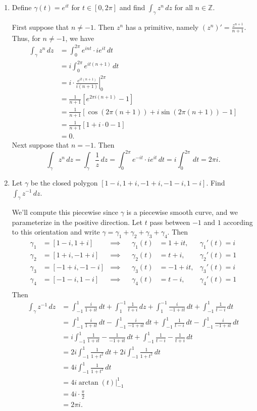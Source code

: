 \documentclass[11pt,oneside,english]{amsart}
\theoremstyle{definition}
\newcommand{\MB}[1]{\mathbb{#1}}
\begin{document}
\begin{enumerate}[leftmargin=*]
\item Define $\gamma(t)=e^{it}$ for $t\in[0,2\pi]$ and find $\int_\gamma z^n\,dz$ for all $n\in \MB{Z}$.


First suppose that $n\neq-1$. Then $z^n$ has a primitive, namely $(z^n)'=\frac{z^{n+1}}{n+1}$. Thus, for $n\neq-1$, we have
\begin{align*}
\int_\gamma z^n\,dz&=\int_0^{2\pi}e^{int}\cdot ie^{it}\,dt\\[2mm]
&=i\int_0^{2\pi}e^{it(n+1)}\,dt\\[2mm]
&=\left.i\cdot\frac{e^{it(n+1)}}{i(n+1)}\right|_0^{2\pi}\\[2mm]
&=\frac{1}{n+1}[e^{2\pi i(n+1)}-1]\\[2mm]
&=\frac{1}{n+1}[\cos(2\pi(n+1))+i\sin(2\pi(n+1))-1]\\[2mm]
&=\frac{1}{n+1}[1+i\cdot0-1]\\[2mm]
&=0.
\end{align*}
Next suppose that $n=-1$. Then
\[
\int_\gamma z^n\,dz=\int_\gamma\frac{1}{z}\,dz=\int_0^{2\pi}e^{-it}\cdot ie^{it}\,dt=i\int_0^{2\pi}\,dt=2\pi i.
\]


\item Let $\gamma$ be the closed polygon $[1-i,1+i,-1+i,-1-i,1-i]$. Find $\int_\gamma z^{-1}\,dz$.

We'll compute this piecewise since $\gamma$ is a piecewise smooth curve, and we parameterize in the positive direction. Let $t$ pass between $-1$ and $1$ according to this orientation and write $\gamma=\gamma_1+\gamma_2+\gamma_3+\gamma_4$. Then
\begin{align*}
\gamma_1&=[1-i,1+i]&\implies &&\gamma_1(t)&=1+it, & \gamma_1'(t)=i\\[2mm]
\gamma_2&=[1+i,-1+i]&\implies && \gamma_2(t)&=t+i, & \gamma_2'(t)=1\\[2mm]
\gamma_3&=[-1+i,-1-i]&\implies && \gamma_3(t)&=-1+it, & \gamma_3'(t)=i\\[2mm]
\gamma_4&=[-1-i,1-i]&\implies && \gamma_4(t)&=t-i, & \gamma_4'(t)=1\\[2mm]
\end{align*}
Then
\begin{align*}
\int_\gamma z^{-1}\,dz&=\int_{-1}^1\frac{i}{1+it}\,dt+\int_{1}^{-1}\frac{1}{t+i}\,dz+\int_{1}^{-1}\frac{i}{-1+it}\,dt+\int_{-1}^1\frac{1}{t-i}\,dt\\[2mm]
&=\int_{-1}^1\frac{i}{1+it}\,dt-\int_{-1}^{1}\frac{i}{-1+it}\,dt+\int_{-1}^1\frac{1}{t-i}\,dt-\int_{-1}^{1}\frac{i}{-1+it}\,dt\\[2mm]
&=i\int_{-1}^1\frac{1}{1+it}-\frac{1}{-1+it}\,dt+\int_{-1}^1\frac{1}{t-i}-\frac{1}{t+i}\,dt\\[2mm]
&=2i\int_{-1}^1\frac{1}{1+t^2}\,dt+2i\int_{-1}^1\frac{1}{1+t^2}\,dt\\[2mm]
&=4i\int_{-1}^1\frac{1}{1+t^2}\,dt\\[2mm]
&=\left.4i\arctan(t)\right|_{-1}^1\\[2mm]
&=4i\cdot\frac{\pi}{2}\\[2mm]
&=2\pi i.
\end{align*}


\end{enumerate}
\end{document}
